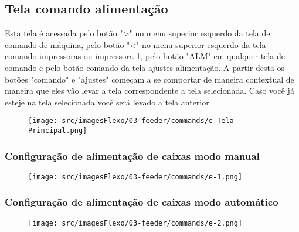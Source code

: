 \thispagestyle{fancy}
\vspace*{40 pt}
\subsection{Tela comando alimentação}
 Esta tela é acessada pelo botão "\textgreater" no menu superior esquerdo da tela de comando de máquina, pelo botão "\textless{}" no menu superior esquerdo da tela 
 comando impressoras ou impressora 1, pelo botão "ALM" em qualquer tela de comando e pelo botão comando da tela ajustes alimentação. A partir desta os botões "comando" 
 e "ajustes" começam a se comportar de maneira contextual de maneira que eles vão levar a tela correspondente a tela selecionada. Caso você já esteje na tela selecionada 
 você será levado a tela anterior.
 \vspace*{\fill}
\begin{figure}[h]
  \centering
  \texttt{[image: src/imagesFlexo/03-feeder/commands/e-Tela-Principal.png]}
\end{figure}
\vspace*{\fill}

\newpage
\thispagestyle{fancy}
\vspace*{40 pt}
\subsubsection{\small{Configuração de alimentação de caixas modo manual}}
\vspace*{\fill}
\begin{figure}[h]
  \centering
  \texttt{[image: src/imagesFlexo/03-feeder/commands/e-1.png]}
\end{figure}
\vspace*{\fill}


\newpage
\thispagestyle{fancy}
\vspace*{40 pt}
\subsubsection{\small{Configuração de alimentação de caixas modo automático}}
\vspace*{\fill}
\begin{figure}[h]
  \centering
  \texttt{[image: src/imagesFlexo/03-feeder/commands/e-2.png]}
\end{figure}
\vspace*{\fill}

\newpage
\thispagestyle{fancy}
\vspace*{40 pt}
